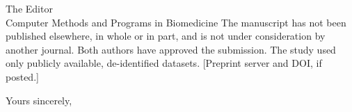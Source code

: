 \documentclass[11pt]{letter}
\begin{document}
\begin{letter}{The Editor\\Computer Methods and Programs in Biomedicine}
The manuscript has not been published elsewhere, in whole or in part, and is not under consideration by another journal. Both authors have approved the submission. The study used only publicly available, de-identified datasets. [Preprint server and DOI, if posted.]

\closing{Yours sincerely,}
\end{letter}
\end{document}
